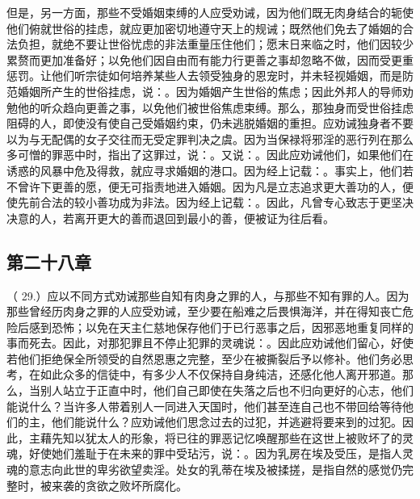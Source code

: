 但是，另一方面，那些不受婚姻束缚的人应受劝诫，因为他们既无肉身结合的轭使他们俯就世俗的挂虑，就应更加密切地遵守天上的规诫；既然他们免去了婚姻的合法负担，就绝不要让世俗忧虑的非法重量压住他们；愿末日来临之时，他们因较少累赘而更加准备好；以免他们因自由而有能力行更善之事却忽略不做，因而受更重惩罚。让他们听宗徒如何培养某些人去领受独身的恩宠时，并未轻视婚姻，而是防范婚姻所产生的世俗挂虑，说：。因为婚姻产生世俗的焦虑；因此外邦人的导师劝勉他的听众趋向更善之事，以免他们被世俗焦虑束缚。那么，那独身而受世俗挂虑阻碍的人，即使没有使自己受婚姻约束，仍未逃脱婚姻的重担。应劝诫独身者不要以为与无配偶的女子交往而无受定罪判决之虞。因为当保禄将邪淫的恶行列在那么多可憎的罪恶中时，指出了这罪过，说：。又说：。因此应劝诫他们，如果他们在诱惑的风暴中危及得救，就应寻求婚姻的港口。因为经上记载：。事实上，他们若不曾许下更善的愿，便无可指责地进入婚姻。因为凡是立志追求更大善功的人，便使先前合法的较小善功成为非法。因为经上记载：。因此，凡曾专心致志于更坚决决意的人，若离开更大的善而退回到最小的善，便被证为往后看。\par


\subsection{第二十八章}

\par

（ 29.）应以不同方式劝诫那些自知有肉身之罪的人，与那些不知有罪的人。因为那些曾经历肉身之罪的人应受劝诫，至少要在船难之后畏惧海洋，并在得知丧亡危险后感到恐怖；以免在天主仁慈地保存他们于已行恶事之后，因邪恶地重复同样的事而死去。因此，对那犯罪且不停止犯罪的灵魂说：。因此应劝诫他们留心，好使若他们拒绝保全所领受的自然恩惠之完整，至少在被撕裂后予以修补。他们务必思考，在如此众多的信徒中，有多少人不仅保持自身纯洁，还感化他人离开邪道。那么，当别人站立于正直中时，他们自己即使在失落之后也不归向更好的心志，他们能说什么？当许多人带着别人一同进入天国时，他们甚至连自己也不带回给等待他们的主，他们能说什么？应劝诫他们思念过去的过犯，并逃避将要来到的过犯。因此，主藉先知以犹太人的形象，将已往的罪恶记忆唤醒那些在这世上被败坏了的灵魂，好使她们羞耻于在未来的罪中受玷污，说：。因为乳房在埃及受压，是指人灵魂的意志向此世的卑劣欲望卖淫。处女的乳蒂在埃及被揉搓，是指自然的感觉仍完整时，被来袭的贪欲之败坏所腐化。\par

